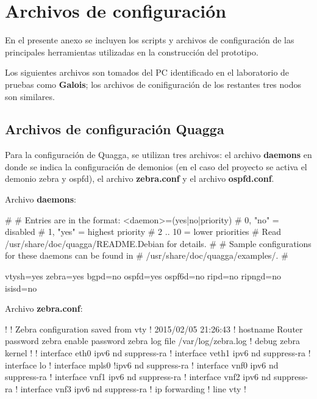
\chapter{Archivos de configuración}
\label{appendix4}

En el presente anexo se incluyen los scripts y archivos de configuraci\'on de las principales herramientas utilizadas en la construcción del prototipo.

Los siguientes archivos son tomados del PC identificado en el laboratorio de pruebas como \textbf{Galois}; los archivos de conifiguraci\'on de los restantes tres nodos son similares.

\section{Archivos de configuraci\'on Quagga}
Para la configuración de Quagga, se utilizan tres archivos: el archivo \textbf{daemons} en donde se indica la configuraci\'on de demonios (en el caso del proyecto se activa el demonio zebra y ospfd), el archivo \textbf{zebra.conf} y el archivo \textbf{ospfd.conf}.

\vspace{1cm}
Archivo \textbf{daemons}:
\begin{bash}
#
# Entries are in the format: <daemon>=(yes|no|priority)
#   0, "no"  = disabled
#   1, "yes" = highest priority
#   2 .. 10  = lower priorities
# Read /usr/share/doc/quagga/README.Debian for details.
#
# Sample configurations for these daemons can be found in
# /usr/share/doc/quagga/examples/.
#

vtysh=yes
zebra=yes
bgpd=no
ospfd=yes
ospf6d=no
ripd=no
ripngd=no
isisd=no

\end{bash}

\newpage

Archivo \textbf{zebra.conf}:
\begin{bash}
!
! Zebra configuration saved from vty
!   2015/02/05 21:26:43
!
hostname Router
password zebra
enable password zebra
log file /var/log/zebra.log
!
debug zebra kernel
!
!
interface eth0
 ipv6 nd suppress-ra
!
interface veth1
 ipv6 nd suppress-ra
!
interface lo
!
interface mpls0
 !ipv6 nd suppress-ra
!
interface vnf0
 ipv6 nd suppress-ra
!
interface vnf1
 ipv6 nd suppress-ra
!
interface vnf2
 ipv6 nd suppress-ra
!
interface vnf3
 ipv6 nd suppress-ra
!
ip forwarding
!
line vty
!
\end{bash}

